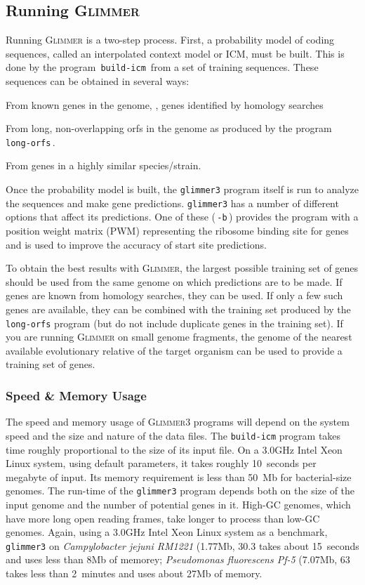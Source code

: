 \documentclass[fleqn,titlepage,11pt]{article}
\def\Glimmer{\textsc{Glimmer}}
\def\Gthree{\textsc{Glimmer3}}
\def\Pg#1{\texttt{#1}}
\begin{document}
\subsection{Running \Glimmer{}}
Running \Glimmer{} is a two-step process.  First, a
probability model of coding sequences, called an
interpolated context model or ICM, must be built.
This is done by the program \,\verb`build-icm`\, from a set of
training sequences.  These sequences can be obtained
in several ways:
\bn\RaggedRight
\item
  From known genes in the genome, \eg, genes identified
  by homology searches
\item
  From long, non-overlapping orfs in the genome as
  produced by the program \,\verb`long-orfs`\,.
\item
  From genes in a highly similar species/strain.
\en

Once the probability model is built, the \Pg{glimmer3} program
itself is run to analyze the sequences and make gene
predictions.  \Pg{glimmer3} has a number of different options
that affect its predictions.  One of these (\,\verb`-b`\,)
provides the program with a position weight matrix (PWM)
representing the ribosome binding site for genes and is used to
improve the accuracy of start site predictions.

To obtain the best results with \Glimmer{}, the largest possible
training set of genes should be used from the same genome on
which predictions are to be made.  If genes are known from
homology searches, they can be used.  If only a few such genes
are available, they can be combined with the training set
produced by the \Pg{long-orfs} program (but do not include
duplicate genes in the training set).  If you are running
\Glimmer{} on small genome fragments, the genome
of the nearest available evolutionary relative of the target
organism can be used to provide a training set of genes.

\subsubsection{Speed \& Memory Usage}
The speed and memory usage of \Gthree{} programs will depend on
the system speed and the size and nature of the data files.
The \Pg{build-icm} program takes time roughly proportional
to the size of its input file.
On a 3.0GHz Intel Xeon Linux system, using default parameters,
it takes roughly 10~seconds per megabyte of input.  Its memory
requirement is less than 50~Mb for bacterial-size genomes.
The run-time of the \Pg{glimmer3} program depends both on
the size of the input genome and the number of potential genes
in it.  High-GC genomes, which have more long open reading frames,
take longer to process than low-GC genomes.  Again, using a 3.0GHz
Intel Xeon Linux system as a benchmark, \Pg{glimmer3} on
\emph{Campylobacter jejuni RM1221} (1.77Mb, 30.3%
takes about 15~seconds and uses less than 8Mb of memorey;
\emph{Pseudomonas fluorescens Pf-5} (7.07Mb, 63%
takes less than 2~minutes and uses about 27Mb of memory.
\end{document}
